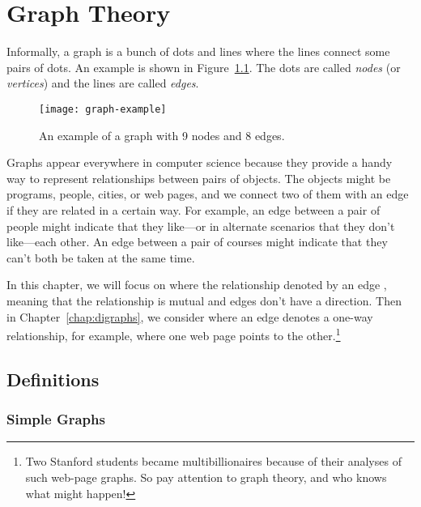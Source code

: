 \chapter{Graph Theory}\label{chap:graph_theory}

Informally, a graph is a bunch of dots and lines where the lines
connect some pairs of dots.  An example is shown in
Figure~\ref{fig:graph-example}.  The dots are called \emph{nodes} (or
\emph{vertices}) and the lines are called \emph{edges}.

\begin{figure}[h]\redrawn

\texttt{[image: graph-example]}

\caption{An example of a graph with 9 nodes and 8 edges.}

\label{fig:graph-example}

\end{figure}

Graphs appear everywhere in computer science because they provide a handy
way to represent relationships between pairs of objects.  The objects
might be programs, people, cities, or web pages, and we connect two of
them with an edge if they are related in a certain way.  For example, an
edge between a pair of people might indicate that they like---or in
alternate scenarios that they don't like---each other.  An edge between a
pair of courses might indicate that they can't both be taken at the same
time.

In this chapter, we will focus on \emph{} where the
relationship denoted by an edge \emph{}, meaning that the
relationship is mutual and edges don't have a direction.  Then in
Chapter~\ref{chap:digraphs}, we consider \emph{}
where an edge denotes a one-way relationship, for example, where one web
page points to the other.\footnote{Two Stanford students became
  multibillionaires because of their analyses of such web-page graphs.  So
  pay attention to graph theory, and who knows what might happen!}

\section{Definitions}\label{degreessec}

\subsection{Simple Graphs}

